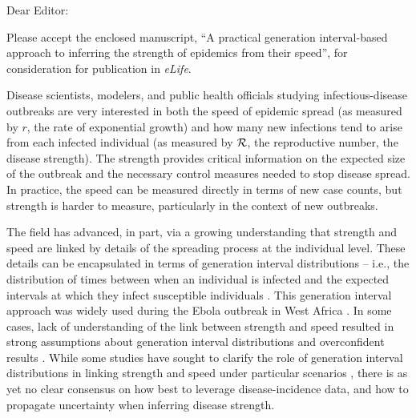 \documentclass[12pt]{letter}
\newcommand{\RR}{\ensuremath{{\cal R}}}
\begin{document}
\date{\today}

\signature{\vspace{-6ex}
Sang Woo Park, David Champredon, Joshua S. Weitz, and Jonathan Dushoff (corresponding author)}

\begin{letter}{
}

\opening{Dear Editor:}

Please accept the enclosed manuscript, ``A practical generation interval-based approach to inferring the strength of epidemics from their speed'', for consideration for publication in \emph{eLife}.

Disease scientists, modelers, and public health officials studying infectious-disease outbreaks are very interested in both the speed of epidemic spread (as measured by $r$, the rate of exponential growth) and how many new infections tend to arise from each infected individual (as measured by \RR, the reproductive number, the disease strength). 
The strength provides critical information on the expected size of the outbreak and the necessary control measures needed to stop disease spread.  
In practice, the speed can be measured directly in terms of new case counts, but strength is harder to measure, particularly in the context of new outbreaks. 

The field has advanced, in part, via a growing understanding that strength and speed are linked by details of the spreading process at the individual level. These details can be encapsulated in terms of generation interval distributions -- i.e., the distribution of times between when an individual is infected and the expected intervals at which they infect susceptible individuals \cite{wallinga2007generation}.
This generation interval approach was widely used during the Ebola outbreak in West Africa \cite{chowell2014transmission, weitz2015modeling, krauer2016heterogeneity}. In some cases, lack of understanding of the link between strength and speed resulted in strong assumptions about generation interval distributions and overconfident results \cite{taylor2016stochasticity}.
While some studies have sought to clarify the role of generation interval distributions in linking strength and speed under particular scenarios \cite{wearing2005appropriate, wallinga2007generation, roberts2007model}, there is as yet no clear consensus on how best to leverage disease-incidence data, and how to propagate uncertainty when inferring disease strength. 


\end{letter}
\end{document}
